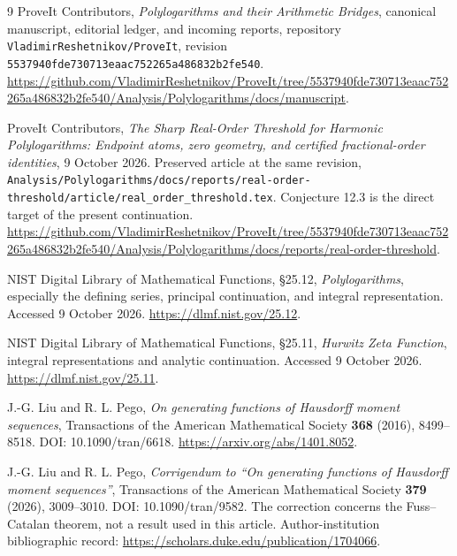 \documentclass[11pt]{article}
\numberwithin{equation}{section}
\theoremstyle{definition}\newtheorem{definition}[theorem]{Definition}
\theoremstyle{remark}\newtheorem{remark}[theorem]{Remark}
\newcommand{\pin}{\nolinkurl{5537940fde730713eaac752265a486832b2fe540}}
\begin{document}
\clearpage
{}
\begin{thebibliography}{9}
ProveIt Contributors, \emph{Polylogarithms and their Arithmetic Bridges},
canonical manuscript, editorial ledger, and incoming reports,
repository \texttt{VladimirReshetnikov/ProveIt}, revision \pin.
\url{https://github.com/VladimirReshetnikov/ProveIt/tree/5537940fde730713eaac752265a486832b2fe540/Analysis/Polylogarithms/docs/manuscript}.

ProveIt Contributors, \emph{The Sharp Real-Order Threshold for Harmonic
Polylogarithms: Endpoint atoms, zero geometry, and certified fractional-order
identities}, 9 October 2026. Preserved article at the same revision,
\nolinkurl{Analysis/Polylogarithms/docs/reports/real-order-threshold/article/real_order_threshold.tex}.
Conjecture 12.3 is the direct target of the present continuation.
\url{https://github.com/VladimirReshetnikov/ProveIt/tree/5537940fde730713eaac752265a486832b2fe540/Analysis/Polylogarithms/docs/reports/real-order-threshold}.

NIST Digital Library of Mathematical Functions, \S25.12,
\emph{Polylogarithms}, especially the defining series, principal
continuation, and integral representation. Accessed 9 October 2026.
\url{https://dlmf.nist.gov/25.12}.

NIST Digital Library of Mathematical Functions, \S25.11,
\emph{Hurwitz Zeta Function}, integral representations and analytic
continuation. Accessed 9 October 2026.
\url{https://dlmf.nist.gov/25.11}.

J.-G. Liu and R. L. Pego, \emph{On generating functions of Hausdorff
moment sequences}, Transactions of the American Mathematical Society
\textbf{368} (2016), 8499--8518. DOI: 10.1090/tran/6618.
\url{https://arxiv.org/abs/1401.8052}.

J.-G. Liu and R. L. Pego, \emph{Corrigendum to ``On generating
functions of Hausdorff moment sequences''}, Transactions of the
American Mathematical Society \textbf{379} (2026), 3009--3010.
DOI: 10.1090/tran/9582.
The correction concerns the Fuss--Catalan theorem, not a result used
in this article. Author-institution bibliographic record:
\url{https://scholars.duke.edu/publication/1704066}.
\end{thebibliography}
\end{document}
